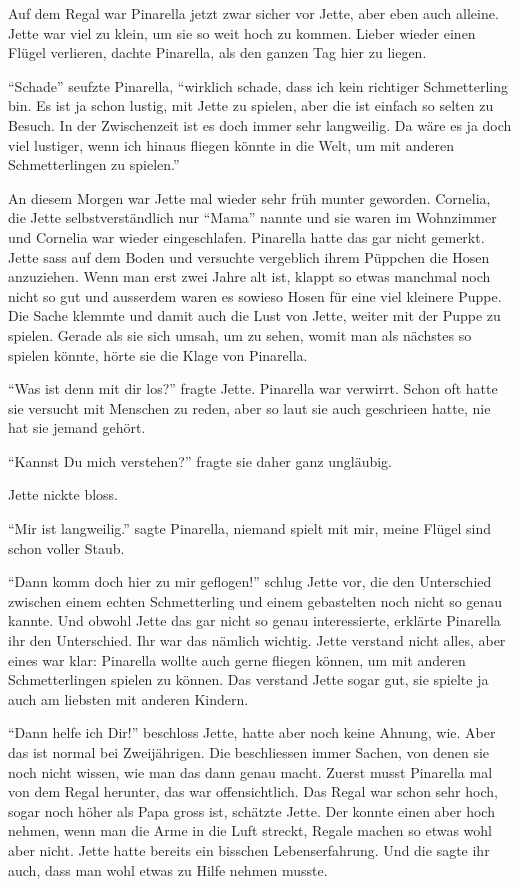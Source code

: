 Auf dem Regal war Pinarella jetzt zwar sicher vor Jette, aber eben auch alleine. Jette war viel zu klein, um sie so weit hoch zu kommen. Lieber wieder einen Flügel verlieren, dachte Pinarella, als den ganzen Tag hier zu liegen. 

\enquote{Schade} seufzte Pinarella, \enquote{wirklich schade, dass ich kein richtiger Schmetterling bin. Es ist ja schon lustig, mit Jette zu spielen, aber die ist einfach so selten zu Besuch. In der Zwischenzeit ist es doch immer sehr langweilig. Da wäre es ja doch viel lustiger, wenn ich hinaus fliegen könnte in die Welt, um mit anderen Schmetterlingen zu spielen.} 

An diesem Morgen war Jette mal wieder sehr früh munter geworden. Cornelia, die Jette selbstverständlich nur \enquote{Mama}  nannte und sie waren im Wohnzimmer und Cornelia war wieder eingeschlafen. Pinarella hatte das gar nicht gemerkt. Jette sass auf dem Boden und versuchte vergeblich ihrem Püppchen die Hosen anzuziehen. Wenn man erst zwei Jahre alt ist, klappt so etwas manchmal noch nicht so gut und ausserdem waren es sowieso Hosen für eine viel kleinere Puppe. Die Sache klemmte und damit auch die Lust von Jette, weiter mit der Puppe zu spielen. Gerade als sie sich umsah, um zu sehen, womit man als nächstes so spielen könnte, hörte sie die Klage von Pinarella. 

\enquote{Was ist denn mit dir los?} fragte Jette. Pinarella war verwirrt. Schon oft hatte sie versucht mit Menschen zu reden, aber so laut sie auch geschrieen hatte, nie hat sie jemand gehört.

\enquote{Kannst Du mich verstehen?} fragte sie daher ganz ungläubig. 

Jette nickte bloss. 

\enquote{Mir ist langweilig.} sagte Pinarella, niemand spielt mit mir, meine Flügel sind schon voller Staub.

\enquote{Dann komm doch hier zu mir geflogen!} schlug Jette vor, die den Unterschied zwischen einem echten Schmetterling und einem gebastelten noch nicht so genau kannte. Und obwohl Jette das gar nicht so genau interessierte, erklärte Pinarella ihr den Unterschied. Ihr war das nämlich wichtig. Jette verstand nicht alles, aber eines war klar: Pinarella wollte auch gerne fliegen können, um mit anderen Schmetterlingen spielen zu können. Das verstand Jette sogar gut, sie spielte ja auch am liebsten mit anderen Kindern.

\enquote{Dann helfe ich Dir!} beschloss Jette, hatte aber noch keine Ahnung, wie. Aber das ist normal bei Zweijährigen. Die beschliessen immer Sachen, von denen sie noch nicht wissen, wie man das dann genau macht. Zuerst musst Pinarella mal von dem Regal herunter, das war offensichtlich. Das Regal war schon sehr hoch, sogar noch höher als Papa gross ist, schätzte Jette. Der konnte einen aber hoch nehmen, wenn man die Arme in die Luft streckt, Regale machen so etwas wohl aber nicht. Jette hatte bereits ein bisschen Lebenserfahrung. Und die sagte ihr auch, dass man wohl etwas zu Hilfe nehmen musste.

